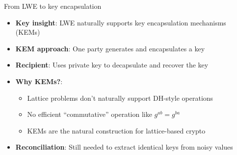 \documentclass[aspectratio=169, lualatex, handout]{beamer}
\begin{document}
\begin{frame}{From LWE to key encapsulation}
	\begin{itemize}
		\item \textbf{Key insight}: LWE naturally supports key encapsulation mechanisms (KEMs)
		\item \textbf{KEM approach}: One party generates and encapsulates a key
		\item \textbf{Recipient}: Uses private key to decapsulate and recover the key
		\item \textbf{Why KEMs?}:
		      \begin{itemize}
			      \item Lattice problems don't naturally support DH-style operations
			      \item No efficient ``commutative'' operation like $g^{ab} = g^{ba}$
			      \item KEMs are the natural construction for lattice-based crypto
		      \end{itemize}
		\item \textbf{Reconciliation}: Still needed to extract identical keys from noisy values
	\end{itemize}
\end{frame}
\end{document}
